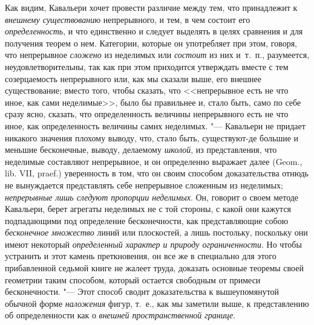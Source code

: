 Как видим, Кавальери хочет провести различие между тем, что принадлежит к
{\em внешнему существованию} непрерывного, и тем, в чем
состоит его {\em определенность}, и что единственно и
следует выделять в целях сравнения и для получения теорем о нем. Категории,
которые он употребляет при этом, говоря, что непрерывное
{\em сложено} из неделимых или
{\em состоит} из них и~т.~п., разумеется,
неудовлетворительны, так как при этом приходится утверждать вместе с тем
созерцаемость непрерывного или, как мы сказали выше, его внешнее
существование; вместо того, чтобы сказать, что <<непрерывное есть не что
иное, как сами неделимые>>, было бы правильнее и, стало быть, само по себе
сразу ясно, сказать, что определенность величины непрерывного есть не что
иное, как определенность величины самих неделимых. "--- Кавальери не придает
никакого значения плохому выводу, что, стало быть, существуют-де большие и
меньшие бесконечные, выводу, делаемому {\em школой}, из
представления, что неделимые составляют непрерывное, и он определенно
выражает далее (Geom., lib. VII, praef.) уверенность в том, что он своим
способом доказательства отнюдь не вынуждается представлять себе непрерывное
сложенным из неделимых; {\em непрерывные лишь следуют
пропорции неделимых}. Он, говорит о своем методе Кавальери, берет агрегаты
неделимых не с той стороны, с какой они кажутся подпадающими под
определение бесконечности, как представляющие собою
{\em бесконечное множество} линий или плоскостей, а
лишь постольку, поскольку они имеют некоторый
{\em определенный характер и природу ограниченности}.
Но чтобы устранить и этот камень преткновения, он все же в специально для
этого прибавленной седьмой книге не жалеет труда, доказать основные теоремы
своей геометрии таким способом, который остается свободным от примеси
бесконечности. "--- Этот способ сводит доказательства к вышеупомянутой обычной
форме {\em наложения} фигур, т.~е., как мы заметили
выше, к представлению об определенности как о
{\em внешней пространственной границе}.

